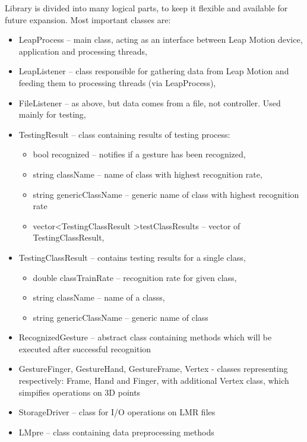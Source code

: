 Library is divided into many logical parts, to keep it flexible and available for future expansion. Most important classes are:
\begin{itemize}
\item LeapProcess -- main class, acting as an interface between Leap Motion device, application and processing threads,
\item LeapListener -- class responsible for gathering data from Leap Motion and feeding them to processing threads (via LeapProcess),
\item FileListener -- as above, but data comes from a file, not controller. Used mainly for testing,
\item TestingResult -- class containing results of testing process:
\begin{itemize}
	\item bool recognized -- notifies if a gesture has been recognized,
	\item string className -- name of class with highest recognition rate,
	\item string genericClassName -- generic name of class with highest recognition rate
	\item vector\textless TestingClassResult \textgreater testClassResults -- vector of TestingClassResult,
\end{itemize}
\item TestingClassResult -- contains testing results for a single class,
\begin{itemize}
	\item double classTrainRate -- recognition rate for given class,
	\item string className -- name of a classs,
	\item string genericClassName -- generic name of class
\end{itemize}

\item RecognizedGesture -- abstract class containing methods which will be executed after successful recognition
\item GestureFinger, GestureHand, GestureFrame, Vertex - classes representing respectively: Frame, Hand and Finger, with additional Vertex class, which simpifies operations on 3D points
\item StorageDriver -- class for I/O operations on LMR files
\item LMpre -- class containing data preprocessing methods

\end{itemize}

